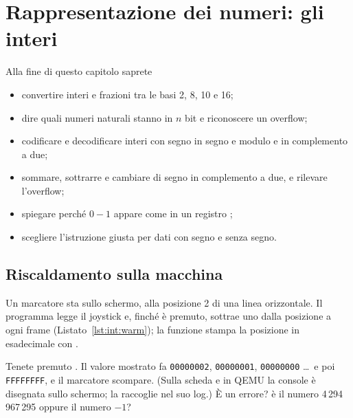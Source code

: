 \chapter{Rappresentazione dei numeri: gli interi}
\label{ch:integers}


\begin{chapgoals}
Alla fine di questo capitolo saprete
\begin{itemize}
\item convertire interi e frazioni tra le basi 2, 8, 10 e 16;
\item dire quali numeri naturali stanno in $n$ bit e riconoscere un overflow;
\item codificare e decodificare interi con segno in segno e modulo e in complemento a due;
\item sommare, sottrarre e cambiare di segno in complemento a due, e rilevare l'overflow;
\item spiegare perché $0-1$ appare come  in un registro \riscv;
\item scegliere l'istruzione \riscv giusta per dati con segno e senza segno.
\end{itemize}
\end{chapgoals}


\section{Riscaldamento sulla macchina}

Un marcatore sta sullo schermo, alla posizione 2 di una linea orizzontale. Il
programma legge il joystick e, finché  è premuto, sottrae uno dalla
posizione a ogni frame (Listato~\ref{lst:int:warm}); la funzione 
stampa la posizione in esadecimale con .


\begin{prgtry}
Tenete premuto . Il valore mostrato fa \texttt{00000002},
\texttt{00000001}, \texttt{00000000} \ldots\ e poi \texttt{FFFFFFFF}, e il
marcatore scompare. (Sulla scheda e in QEMU la console è disegnata sullo
schermo; \prgqt la raccoglie nel suo log.) È un errore?  è il
numero 4\,294\,967\,295 oppure il numero $-1$?
\end{prgtry}

